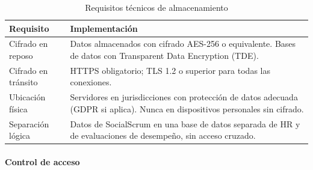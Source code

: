 \begin{table}[h]
    \centering
    \small
    \begin{tabularx}{\textwidth}{|l|X|}
        \hline
        \textbf{Requisito} & \textbf{Implementación}                                                                                                       \\
        \hline
        Cifrado en reposo
                           & Datos almacenados con cifrado AES-256 o equivalente. Bases de datos con Transparent Data Encryption (TDE).                    \\
        \hline
        Cifrado en tránsito
                           & HTTPS obligatorio; TLS 1.2 o superior para todas las conexiones.                                                              \\
        \hline
        Ubicación física
                           & Servidores en jurisdicciones con protección de datos adecuada (GDPR si aplica). Nunca en dispositivos personales sin cifrado. \\
        \hline
        Separación lógica
                           & Datos de SocialScrum en una base de datos separada de HR y de evaluaciones de desempeño, sin acceso cruzado.                  \\
        \hline
    \end{tabularx}
    \caption{Requisitos técnicos de almacenamiento}
    \label{tab:almacenamiento-tecnico}
\end{table}
\FloatBarrier

\paragraph{Control de acceso}


